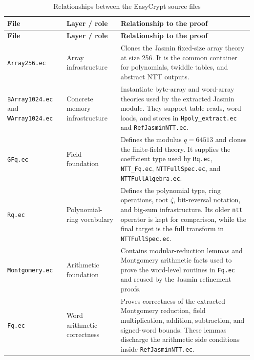 \small
\begin{longtable}{
  >{\raggedright\arraybackslash}p{}
  >{\raggedright\arraybackslash}p{}
  >{\raggedright\arraybackslash}p{}}
\caption{Relationships between the EasyCrypt source files}
\label{tab:ec_file_relationships}\\
\toprule
\textbf{File} & \textbf{Layer / role} & \textbf{Relationship to the proof} \\
\midrule
\endfirsthead
\toprule
\textbf{File} & \textbf{Layer / role} & \textbf{Relationship to the proof} \\
\midrule
\endhead
\bottomrule
\endfoot

\texttt{Array256.ec} &
Array infrastructure &
Clones the Jasmin fixed-size array theory at size 256.  It is the common
container for polynomials, twiddle tables, and abstract NTT outputs. \\

\texttt{BArray1024.ec} and \texttt{WArray1024.ec} &
Concrete memory infrastructure &
Instantiate byte-array and word-array theories used by the extracted Jasmin
module.  They support table reads, word loads, and stores in
\texttt{Hpoly\_extract.ec} and \texttt{RefJasminNTT.ec}. \\

\texttt{GFq.ec} &
Field foundation &
Defines the \haetae{} modulus \(q=64513\) and clones the finite-field theory.
It supplies the coefficient type used by \texttt{Rq.ec}, \texttt{NTT\_Fq.ec},
\texttt{NTTFullSpec.ec}, and \texttt{NTTFullAlgebra.ec}. \\

\texttt{Rq.ec} &
Polynomial-ring vocabulary &
Defines the polynomial type, ring operations, root \(\zeta\), bit-reversal
notation, and big-sum infrastructure.  Its older \texttt{ntt} operator is kept
for comparison, while the final target is the full transform in
\texttt{NTTFullSpec.ec}. \\

\texttt{Montgomery.ec} &
Arithmetic foundation &
Contains modular-reduction lemmas and Montgomery arithmetic facts used to prove
the word-level routines in \texttt{Fq.ec} and reused by the Jasmin refinement
proofs. \\

\texttt{Fq.ec} &
Word arithmetic correctness &
Proves correctness of the extracted Montgomery reduction, field multiplication,
addition, subtraction, and signed-word bounds.  These lemmas discharge the
arithmetic side conditions inside \texttt{RefJasminNTT.ec}. \\


\end{longtable}
